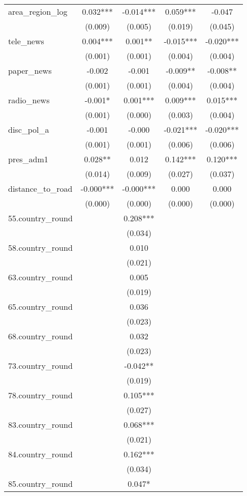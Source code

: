 \documentclass[]{article}
\begin{document}
\begin{tabular}{lcccc}
area\_region\_log & 0.032*** & -0.014*** & 0.059*** & -0.047 \\
 & (0.009) & (0.005) & (0.019) & (0.045) \\
tele\_news & 0.004*** & 0.001** & -0.015*** & -0.020*** \\
 & (0.001) & (0.001) & (0.004) & (0.004) \\
paper\_news & -0.002 & -0.001 & -0.009** & -0.008** \\
 & (0.001) & (0.001) & (0.004) & (0.004) \\
radio\_news & -0.001* & 0.001*** & 0.009*** & 0.015*** \\
 & (0.001) & (0.000) & (0.003) & (0.004) \\
disc\_pol\_a & -0.001 & -0.000 & -0.021*** & -0.020*** \\
 & (0.001) & (0.001) & (0.006) & (0.006) \\
pres\_adm1 & 0.028** & 0.012 & 0.142*** & 0.120*** \\
 & (0.014) & (0.009) & (0.027) & (0.037) \\
distance\_to\_road & -0.000*** & -0.000*** & 0.000 & 0.000 \\
 & (0.000) & (0.000) & (0.000) & (0.000) \\
55.country\_round &  & 0.208*** &  &  \\
 &  & (0.034) &  &  \\
58.country\_round &  & 0.010 &  &  \\
 &  & (0.021) &  &  \\
63.country\_round &  & 0.005 &  &  \\
 &  & (0.019) &  &  \\
65.country\_round &  & 0.036 &  &  \\
 &  & (0.023) &  &  \\
68.country\_round &  & 0.032 &  &  \\
 &  & (0.023) &  &  \\
73.country\_round &  & -0.042** &  &  \\
 &  & (0.019) &  &  \\
78.country\_round &  & 0.105*** &  &  \\
 &  & (0.027) &  &  \\
83.country\_round &  & 0.068*** &  &  \\
 &  & (0.021) &  &  \\
84.country\_round &  & 0.162*** &  &  \\
 &  & (0.034) &  &  \\
85.country\_round &  & 0.047* &  &  \\

\end{tabular}
\end{document}

